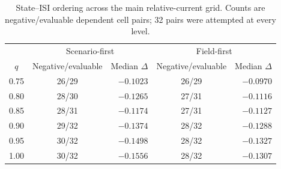 \begin{table}[htbp]\centering\small
\caption{State--ISI ordering across the main relative-current grid. Counts are negative/evaluable dependent cell pairs; 32 pairs were attempted at every level.}\label{tab:q}
\begin{tabular}{@{}ccrcr@{}}\toprule &\multicolumn{2}{c}{Scenario-first}&\multicolumn{2}{c}{Field-first}\\
$q$&Negative/evaluable&Median $\Delta$&Negative/evaluable&Median $\Delta$\\\midrule
0.75&26/29&$-0.1023$&26/29&$-0.0970$\\
0.80&28/30&$-0.1265$&27/31&$-0.1116$\\
0.85&28/31&$-0.1174$&27/31&$-0.1127$\\
0.90&29/32&$-0.1374$&28/32&$-0.1288$\\
0.95&30/32&$-0.1498$&28/32&$-0.1327$\\
1.00&30/32&$-0.1556$&28/32&$-0.1307$\\
\bottomrule\end{tabular}\end{table}
